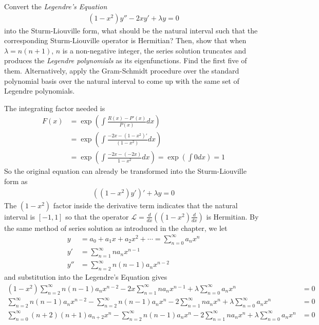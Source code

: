 \begin{Exercise}
Convert the \textit{Legendre's Equation}
\begin{align}
(1-x^2) y'' - 2xy' + \lambda y = 0
\end{align}
into the Sturm-Liouville form, what should be the natural interval such that the corresponding Sturm-Liouville operator is Hermitian? Then, show that when $\lambda = n(n+1)$, $n$ is a non-negative integer, the series solution truncates and produces the \textit{Legendre polynomials} as its eigenfunctions. Find the first five of them. Alternatively, apply the Gram-Schmidt procedure over the standard polynomial basis over the natural interval to come up with the same set of Legendre polynomials.
\end{Exercise}
\begin{Answer}
The integrating factor needed is
\begin{align*}
F(x) &= \exp(\int \frac{R(x) - P'(x)}{P(x)} dx) \\
&= \exp(\int \frac{-2x-(1-x^2)'}{(1-x^2)} dx) \\
&= \exp(\int \frac{-2x-(-2x)}{1-x^2} dx) = \exp(\int 0 dx) = 1
\end{align*}
So the original equation can already be transformed into the Sturm-Liouville form as
\begin{align*}
((1-x^2) y')' + \lambda y = 0    
\end{align*}
The $(1-x^2)$ factor inside the derivative term indicates that the natural interval is $[-1, 1]$ so that the operator $\mathcal{L} = \frac{d}{dx}((1-x^2)\frac{d}{dx})$ is Hermitian. By the same method of series solution as introduced in the chapter, we let
\begin{align*}
y &= a_0 + a_1x + a_2x^2 + \cdots = \sum_{n=0}^{\infty} a_n x^n \\
y' &= \sum_{n=1}^{\infty} n a_nx^{n-1} \\
y'' &= \sum_{n=2}^{\infty} n(n-1) a_nx^{n-2}
\end{align*}
and substitution into the Legendre's Equation gives
\begin{align*}
(1-x^2) \sum_{n=2}^{\infty} n(n-1) a_nx^{n-2} - 2x\sum_{n=1}^{\infty} n a_nx^{n-1} + \lambda \sum_{n=0}^{\infty} a_n x^n &= 0 \\
\sum_{n=2}^{\infty} n(n-1) a_nx^{n-2} - \sum_{n=2}^{\infty} n(n-1) a_nx^{n} - 2\sum_{n=1}^{\infty} n a_nx^{n} + \lambda \sum_{n=0}^{\infty} a_n x^n &= 0 \\
\sum_{n=0}^{\infty} (n+2)(n+1) a_{n+2}x^{n} - \sum_{n=2}^{\infty} n(n-1) a_nx^{n} - 2\sum_{n=1}^{\infty} n a_nx^{n} + \lambda \sum_{n=0}^{\infty} a_n x^n &= 0

\end{align*}
\end{Answer}
